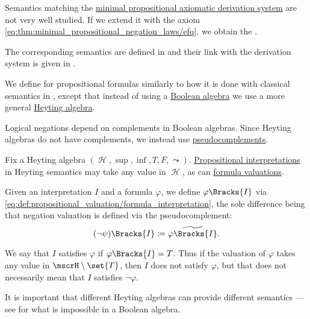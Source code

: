 \smallskip

\begin{definition}\label{def:intuitionistic_propositional_axiomatic_derivation_system}
  Semantics matching the \hyperref[def:minimal_propositional_axiomatic_derivation_system]{minimal propositional axiomatic derivation system} are not very well studied. If we extend it with the axiom \eqref{eq:thm:minimal_propositional_negation_laws/efq}, we obtain the .

  The corresponding semantics are defined in  and their link with the derivation system is given in .
\end{definition}

\begin{definition}\label{def:propositional_heyting_semantics}
  We define  for propositional formulas similarly to how it is done with classical semantics in , except that instead of using a \hyperref[def:boolean_algebra]{Boolean algebra} we use a more general \hyperref[def:heyting_algebra]{Heyting algebra}.

  Logical negations depend on complements in Boolean algebras. Since Heyting algebras do not have complements, we instead use \hyperref[def:heyting_algebra/pseudocomplement]{pseudocomplements}.

  Fix a Heyting algebra \( (\mscrH, \sup, \inf, T, F, \leadsto) \). \hyperref[def:propositional_valuation/interpretation]{Propositional interpretations} in Heyting semantics may take any value in \( \mscrH \), as can \hyperref[def:propositional_valuation/formula_semantics]{formula valuations}.

  Given an interpretation \( I \) and a formula \( \varphi \), we define \( \varphi\Bracks{I} \) via \eqref{eq:def:propositional_valuation/formula_interpretation}, the sole difference being that negation valuation is defined via the pseudocomplement:
  \begin{equation*}
    (\neg \psi)\Bracks{I} \coloneqq \widetilde{\varphi\Bracks{I}}.
  \end{equation*}

  We say that \( I \) satisfies \( \varphi \) if \( \varphi\Bracks{I} = T \). Thus if the valuation of \( \varphi \) takes any value in \( \mscrH \setminus \set{ T } \), then \( I \) does not satisfy \( \varphi \), but that does not necessarily mean that \( I \) satisfies \( \neg \varphi \).

  It is important that different Heyting algebras can provide different semantics --- see  for what is impossible in a Boolean algebra.
\end{definition}

